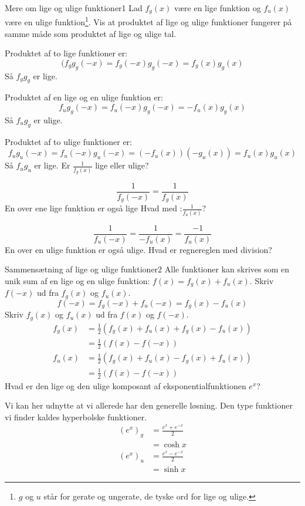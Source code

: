 \begin{opgave}{Mere om lige og ulige funktioner}{1}
Lad $f_g(x)$ være en lige funktion og $f_u(x)$ være en ulige funktion\footnote{$g$ og $u$ står for gerate og ungerate, de tyske ord for lige og ulige.}.
\opg Vis at produktet af lige og ulige funktioner fungerer på samme måde som produktet af lige og ulige tal.

Produktet af to lige funktioner er:
$$(f_gg_g(-x) = f_g(-x)g_g(-x) = f_g(x)g_g(x)$$
Så $f_gg_g$ er lige.

Produktet af en lige og en ulige funktion er:
$$
f_ug_g(-x) = f_u(-x)g_g(-x) = -f_u(x)g_g(x)
$$
Så $f_ug_g$ er ulige.

Produktet af to ulige funktioner er:
$$
f_ug_u(-x) = f_u(-x)g_u(-x) = (-f_u(x))(-g_u(x)) = f_u(x)g_u(x)
$$
Så $f_ug_u$ er lige.
\opg Er $\frac{1}{f_{g}(x)}$ lige eller ulige?

$$
\frac{1}{f_g(-x)}=\frac{1}{f_g(x)}
$$
En over ene lige funktion er også lige
\opg Hvad med :$\frac{1}{f_{u}(x)}$?

$$
\frac{1}{f_u(-x)} = \frac{1}{-f_u(x)} = \frac{-1}{f_u(x)}
$$
En over en ulige funktion er også ulige.
\opg Hvad er regnereglen med division?
\end{opgave}
\begin{opgave}{Sammensætning af lige og ulige funktioner}{2}
Alle funktioner kan skrives som en unik sum af en lige og en ulige funktion: $f(x) = f_g(x)+f_u(x)$. 
\opg Skriv $f(-x)$ ud fra $f_g(x)$ og $f_u(x)$.
$$
    f(-x) = f_g(-x)+f_u(-x)
    = f_g(x)-f_u(x)
$$
\opg Skriv $f_g(x)$ og $f_u(x)$ ud fra $f(x)$ og $f(-x)$.
\begin{align*}
f_g(x) &= \frac{1}{2}(f_g(x)+f_u(x)+f_g(x)-f_u(x))\\
&= \frac{1}{2}(f(x)-f(-x))\\
f_u(x) &= \frac{1}{2}(f_g(x)+f_u(x)-f_g(x)+f_u(x))\\
&= \frac{1}{2}(f(x)-f(-x))
\end{align*}
\opg Hvad er den lige og den ulige komposant af eksponentialfunktionen $e^x$?

Vi kan her udnytte at vi allerede har den generelle løsning. Den type funktioner vi finder kaldes hyperbolske funktioner.
\begin{align*}
    \left(e^x\right)_g &= \frac{e^x+e^{-x}}{2}\\
    &= \cosh x\\
    \left(e^x\right)_u &= \frac{e^x-e^{-x}}{2}\\
    &= \sinh x
\end{align*}
\end{opgave}

